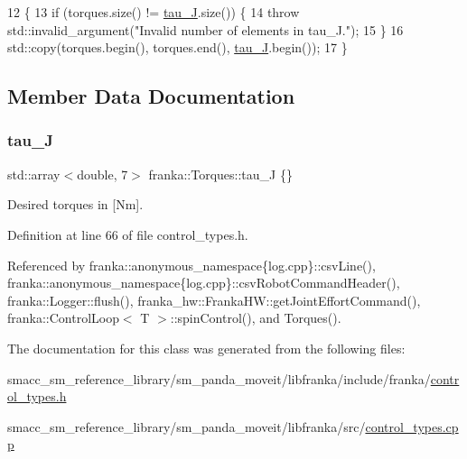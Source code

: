 \begin{DoxyCode}
12                                                     \{
13   \textcolor{keywordflow}{if} (torques.size() != \hyperlink{classfranka_1_1Torques_ac2a266cc2d3b7e0fb4f8eff045dbaed8}{tau\_J}.size()) \{
14     \textcolor{keywordflow}{throw} std::invalid\_argument(\textcolor{stringliteral}{"Invalid number of elements in tau\_J."});
15   \}
16   std::copy(torques.begin(), torques.end(), \hyperlink{classfranka_1_1Torques_ac2a266cc2d3b7e0fb4f8eff045dbaed8}{tau\_J}.begin());
17 \}
\end{DoxyCode}


\subsection{Member Data Documentation}
\mbox{\label{classfranka_1_1Torques_ac2a266cc2d3b7e0fb4f8eff045dbaed8}} 
\subsubsection{\texorpdfstring{tau\+\_\+J}{tau\_J}}
{\footnotesize\ttfamily std\+::array$<$double, 7$>$ franka\+::\+Torques\+::tau\+\_\+J \{\}}

Desired torques in \mbox{[}Nm\mbox{]}. 

Definition at line 66 of file control\+\_\+types.\+h.



Referenced by franka\+::anonymous\+\_\+namespace\{log.\+cpp\}\+::csv\+Line(), franka\+::anonymous\+\_\+namespace\{log.\+cpp\}\+::csv\+Robot\+Command\+Header(), franka\+::\+Logger\+::flush(), franka\+\_\+hw\+::\+Franka\+H\+W\+::get\+Joint\+Effort\+Command(), franka\+::\+Control\+Loop$<$ T $>$\+::spin\+Control(), and Torques().



The documentation for this class was generated from the following files\+:\begin{DoxyCompactItemize}
\item 
smacc\+\_\+sm\+\_\+reference\+\_\+library/sm\+\_\+panda\+\_\+moveit/libfranka/include/franka/\hyperlink{control__types_8h}{control\+\_\+types.\+h}\item 
smacc\+\_\+sm\+\_\+reference\+\_\+library/sm\+\_\+panda\+\_\+moveit/libfranka/src/\hyperlink{control__types_8cpp}{control\+\_\+types.\+cpp}\end{DoxyCompactItemize}
